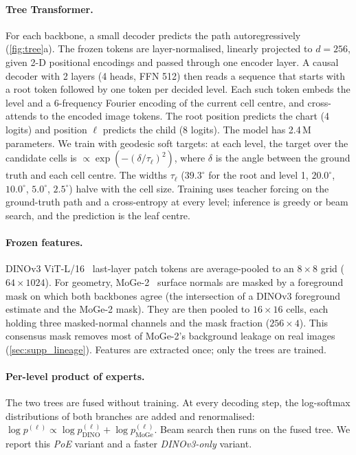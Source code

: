 \paragraph{Tree Transformer.}
For each backbone, a small decoder predicts the path autoregressively (\cref{fig:tree}a). The frozen tokens are layer-normalised, linearly projected to $d=256$, given 2-D positional encodings and passed through one encoder layer. A causal decoder with 2 layers (4 heads, FFN 512) then reads a sequence that starts with a root token followed by one token per decided level. Each such token embeds the level and a 6-frequency Fourier encoding of the current cell centre, and cross-attends to the encoded image tokens. The root position predicts the chart (4 logits) and position $\ell$ predicts the child (8 logits). The model has 2.4\,M parameters.
We train with geodesic soft targets: at each level, the target over the candidate cells is $\propto\exp(-(\delta/\tau_\ell)^2)$, where $\delta$ is the angle between the ground truth and each cell centre. The widths $\tau_\ell$ ($39.3^\circ$ for the root and level 1, $20.0^\circ$, $10.0^\circ$, $5.0^\circ$, $2.5^\circ$) halve with the cell size. Training uses teacher forcing on the ground-truth path and a cross-entropy at every level; inference is greedy or beam search, and the prediction is the leaf centre.

\paragraph{Frozen features.}
DINOv3 ViT-L/16~\cite{simeoni2025dinov3} last-layer patch tokens are average-pooled to an $8{\times}8$ grid ($64\times1024$). For geometry, MoGe-2~\cite{wang2025moge2} surface normals are masked by a foreground mask on which both backbones agree (the intersection of a DINOv3 foreground estimate and the MoGe-2 mask). They are then pooled to $16{\times}16$ cells, each holding three masked-normal channels and the mask fraction ($256\times4$). This consensus mask removes most of MoGe-2's background leakage on real images (\cref{sec:supp_lineage}). Features are extracted once; only the trees are trained.

\paragraph{Per-level product of experts.}
The two trees are fused without training. At every decoding step, the log-softmax distributions of both branches are added and renormalised: $\log p^{(\ell)}\propto\log p^{(\ell)}_{\text{DINO}}+\log p^{(\ell)}_{\text{MoGe}}$. Beam search then runs on the fused tree. We report this \emph{PoE} variant and a faster \emph{DINOv3-only} variant.

